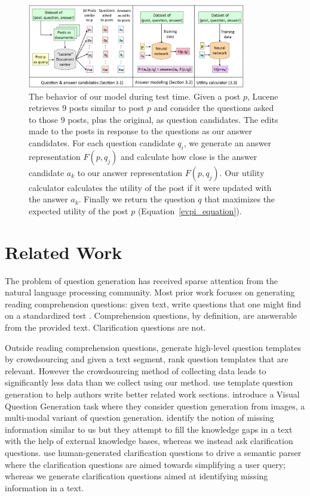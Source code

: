 \documentclass[11pt]{report}
\renewcommand\cite{\citep}	%
\newcommand\newcite{\citet}	%
\begin{document}
\begin{figure}[t]
\centering
\includegraphics[width=0.85\textwidth]{model}
\caption{\small The behavior of our model during test time. Given a post $p$, Lucene retrieves 9 posts similar to post $p$ and consider the questions asked to those 9 posts, plus the original, as question candidates. The edits made to the posts in response to the questions as our answer candidates. For each question candidate $q_i$, we generate an answer representation $F(p,q_j)$ and calculate how close is the answer candidate $a_k$ to our answer representation $F(p,q_j)$. Our utility calculator calculates the utility of the post if it were updated with the answer $a_k$. Finally we return the question $q$ that maximizes the expected utility of the post $p$ (Equation~\ref{evpi_equation}).}
\label{model}
\end{figure}

\section{Related Work} \label{related_work}

The problem of question generation has received sparse attention from the natural language processing community. Most prior work focuses on generating reading comprehension questions:  given text, write questions that one might find on a standardized test \cite{vanderwende2008importance,heilman2011automatic,rus2011question,olney2012question}.  Comprehension questions, by definition, are answerable from the provided text. Clarification questions are not.  

Outside reading comprehension questions, \newcite{labutov2015deep} generate high-level question templates by crowdsourcing and given a text segment, rank question templates that are relevant. However the crowdsourcing method of collecting data leads to significantly less data than we collect using our method. \newcite{liu2010automatic} use template question generation to help authors write better related work sections. \newcite{mostafazadeh2016generating} introduce a Visual Question Generation task where they consider question generation from images, a multi-modal variant of question generation. 
\newcite{penas2010filling} identify the notion of missing information similar to us but they attempt to fill the knowledge gaps in a text with the help of external knowledge bases, whereas we instead ask clarification questions. \newcite{artzi2011bootstrapping} use human-generated clarification questions to drive a semantic parser where the clarification questions are aimed towards simplifying a user query; whereas we generate clarification questions aimed at  identifying missing information in a text. 
\end{document}
